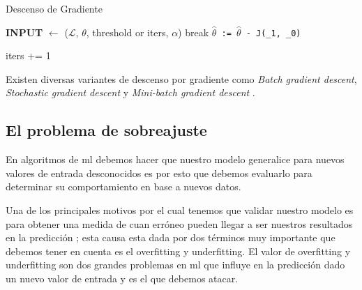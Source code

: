

	

\begin{algorithm}[H] \caption{Descenso de Gradiente}\label{euclid}
\begin{algorithmic}[1]
\State \textbf{INPUT} $\gets$ ($\mathcal{L}$, $\theta$, threshold or iters, $\alpha$)
	\State	break
\Else
	\State \texttt{$\hat\theta$ := $\hat\theta$ - \alpha \frac{\partial}{\partial \theta} J(\theta_{1}, \theta_{0})}
	
\EndIf
\State iters += 1
\EndWhile
\end{algorithmic}
\end{algorithm}


Existen diversas variantes de descenso por gradiente como \textit{Batch gradient descent}, \textit{Stochastic gradient descent} y \textit{Mini-batch gradient descent} \citep{variants_gd}.

\subsection{El problema de sobreajuste}\label{sub:validacion-modelo}

En algoritmos de \ac{ml} debemos hacer que nuestro modelo generalice para nuevos valores de entrada desconocidos es por esto que debemos evaluarlo para determinar su comportamiento en base a nuevos datos. 

Una de los principales motivos por el cual tenemos que validar nuestro modelo es para obtener una medida de cuan erróneo pueden llegar a ser nuestros resultados en la predicción ; esta causa esta dada por dos términos muy importante que debemos tener en cuenta es el  overfitting y underfitting. El valor de overfitting y underfitting son dos grandes problemas en \ac{ml} que influye en la predicción dado un nuevo valor de entrada y es el que debemos atacar. 

